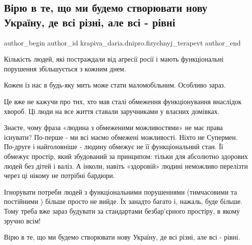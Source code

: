  
 
 
 
 

\subsection{Вірю в те, що ми будемо створювати нову Україну, де всі різні, але всі - рівні}
\label{sec:03_01_2023.fb.krapiva_daria.dnipro.fizychnyj_terapevt.1.v_ryu_v_te__shcho_mi}

\ifcmt
 author_begin
   author_id krapiva_daria.dnipro.fizychnyj_terapevt
 author_end
\fi

Кількість людей, які постраждали від агресії росії і мають функціональні
порушення збільшується з кожним днем. 

Кожен їз нас в будь-яку мить може стати маломобільним. Особливо зараз. 

Це вже не кажучи про тих, хто мав сталі обмеження функціонування внаслідок
хвороб. Ці люди на все життя ставали заручниками у власних домівках. 

Знаєте, чому фраза «людина з обмеженими можливостями» не має права існувати?
По-перше - ми всі маємо обмежені можливості. Ніхто не Супермен. По-друге і
найголовніше - людину обмежує не її функціональний стан. Її обмежує простір,
який збудований за принципом: тільки для абсолютно здорових людей без дітей і
валіз. А інколи, навіть «здоровій» людині неможливо перелізти через ці нікому
не потрібні бардюри. 

Ігнорувати потреби людей з функціональними порушеннями (тимчасовими та
постійними ) більше просто не вийде. Їх занадто багато і, нажаль, буде більше.
Тому треба вже зараз будувати за стандартами безбар'єрного простіру, в якому
зручно всім! 

Вірю в те, що ми будемо створювати нову Україну, де всі різні, але всі - рівні.

